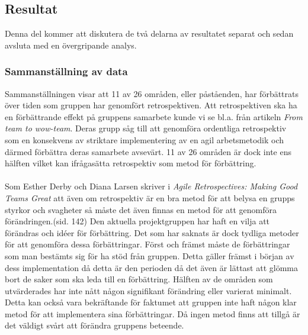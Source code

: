\subsection{Resultat}
\label{sec:johan_n-discussion-results}
Denna del kommer att diskutera de två delarna av resultatet separat och sedan avsluta med en övergripande analys.

\subsubsection{Sammanställning av data}
\label{sec:johan_n-discussion-results-data}
Sammanställningen visar att 11 av 26 områden, eller påståenden, har förbättrats över tiden som gruppen har genomfört retrospektiven. Att retrospektiven ska ha en förbättrande effekt på gruppens samarbete kunde vi se bl.a. från artikeln \textit{From team to wow-team}.\cite{wow_team} Deras grupp såg till att genomföra ordentliga retrospektiv som en konsekvens av striktare implementering av en agil arbetsmetodik och därmed förbättra deras samarbete avsevärt. 11 av 26 områden är dock inte ens hälften vilket kan ifrågasätta retrospektiv som metod för förbättring. \\\\
Som Esther Derby och Diana Larsen skriver i \textit{Agile Retrospectives: Making Good Teams Great} att även om retrospektiv är en bra metod för att belysa en grupps styrkor och svagheter så måste det även finnas en metod för att genomföra förändringen.\cite{agile_retrospectives}(sid. 142) Den aktuella projektgruppen har haft en vilja att förändras och idéer för förbättring. Det som har saknats är dock tydliga metoder för att genomföra dessa förbättringar. Först och främst måste de förbättringar som man bestämts sig för ha stöd från gruppen. Detta gäller främst i början av dess implementation då detta är den perioden då det även är lättast att glömma bort de saker som ska leda till en förbättring. Hälften av de områden som utvärderades har inte nått någon signifikant förändring eller varierat minimalt. Detta kan också vara bekräftande för faktumet att gruppen inte haft någon klar metod för att implementera sina förbättringar. Då ingen metod finns att tillgå är det väldigt svårt att förändra gruppens beteende.\\\\
